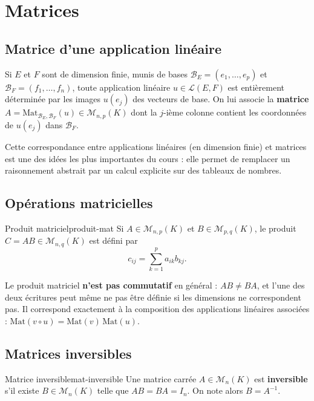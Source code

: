 \documentclass[theme=pringlea]{myrtille}
\begin{document}
\section{Matrices}

\subsection{Matrice d'une application linéaire}
Si $E$ et $F$ sont de dimension finie, munis de bases $\mathcal{B}_E = (e_1,\dots,e_p)$ et $\mathcal{B}_F = (f_1,\dots,f_n)$, toute application linéaire $u \in \mathcal{L}(E,F)$ est entièrement déterminée par les images $u(e_j)$ des vecteurs de base. On lui associe la \textbf{matrice} $A = \mathrm{Mat}_{\mathcal{B}_E, \mathcal{B}_F}(u) \in \mathcal{M}_{n,p}(K)$ dont la $j$-ième colonne contient les coordonnées de $u(e_j)$ dans $\mathcal{B}_F$.

\begin{infobox}
Cette correspondance entre applications linéaires (en dimension finie) et matrices est une des idées les plus importantes du cours : elle permet de remplacer un raisonnement abstrait par un calcul explicite sur des tableaux de nombres.
\end{infobox}

\subsection{Opérations matricielles}
\begin{myrdef}{Produit matriciel}{produit-mat}
Si $A \in \mathcal{M}_{n,p}(K)$ et $B \in \mathcal{M}_{p,q}(K)$, le produit $C = AB \in \mathcal{M}_{n,q}(K)$ est défini par
\[ c_{ij} = \sum_{k=1}^{p} a_{ik} b_{kj}. \]
\end{myrdef}

\begin{warnbox}
Le produit matriciel \textbf{n'est pas commutatif} en général : $AB \neq BA$, et l'une des deux écritures peut même ne pas être définie si les dimensions ne correspondent pas. Il correspond exactement à la composition des applications linéaires associées : $\mathrm{Mat}(v \circ u) = \mathrm{Mat}(v)\,\mathrm{Mat}(u)$.
\end{warnbox}

\subsection{Matrices inversibles}
\begin{myrdef}{Matrice inversible}{mat-inversible}
Une matrice carrée $A \in \mathcal{M}_n(K)$ est \textbf{inversible} s'il existe $B \in \mathcal{M}_n(K)$ telle que $AB = BA = I_n$. On note alors $B = A^{-1}$.
\end{myrdef}
\end{document}
